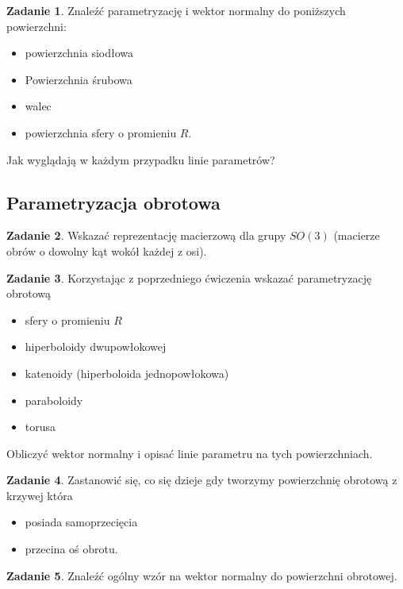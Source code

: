 \documentclass[a4paper,11pt]{article}
\theoremstyle{definition}\newtheorem{exercise}{Zadanie}
\theoremstyle{definition}\newtheorem{remark}{Uwaga}
\begin{document}
\begin{exercise}
 Znaleźć parametryzację i wektor normalny do poniższych powierzchni:
 \begin{itemize}
  \item powierzchnia siodłowa
  \item Powierzchnia śrubowa 
  \item walec
  \item powierzchnia sfery o promieniu $R$.
 \end{itemize}
 Jak wyglądają w każdym przypadku linie parametr\'ow?
\end{exercise}

\subsection{Parametryzacja obrotowa}

\begin{exercise}
Wskazać reprezentację macierzową dla grupy $SO(3)$ (macierze obr\'ow o dowolny 
kąt wok\'oł każdej z osi).
\end{exercise}

\begin{exercise}
Korzystając z poprzedniego ćwiczenia wskazać parametryzację obrotową 
\begin{itemize}
 \item sfery o promieniu $R$
 \item hiperboloidy dwupowłokowej
 \item katenoidy (hiperboloida jednopowłokowa)
 \item paraboloidy
\item torusa
 \end{itemize}
Obliczyć wektor normalny i opisać linie parametru na tych powierzchniach.
\end{exercise}

\begin{exercise}
Zastanowić się, co się dzieje gdy tworzymy powierzchnię obrotową z 
krzywej kt\'ora 
\begin{itemize}
 \item posiada samoprzecięcia
 \item przecina oś obrotu.
\end{itemize}

\end{exercise}

\begin{exercise}
 Znaleźć og\'olny wz\'or na wektor normalny do powierzchni obrotowej.
\end{exercise}
\end{document}
